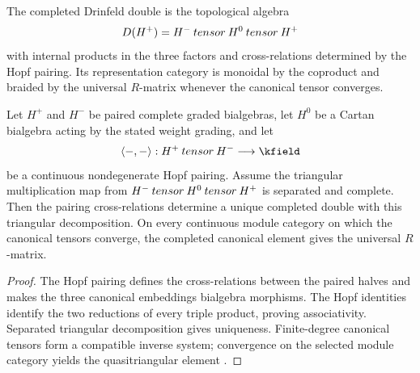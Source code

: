 \begin{definition}
The completed Drinfeld double is the topological algebra
\[
 D(H^+)=H^-\mathbin{tensor} H^0\mathbin{tensor} H^+
\]
with internal products in the three factors and cross-relations determined by the Hopf pairing. Its representation category is monoidal by the coproduct and braided by the universal $R$-matrix whenever the canonical tensor converges.
\end{definition}

\begin{theorem}
Let $H^+$ and $H^-$ be paired complete graded bialgebras, let $H^0$ be a Cartan bialgebra acting by the stated weight grading, and let
\[
 \angles{-,-}:H^+\widehattensor H^-\longrightarrow\kfield
\]
be a continuous nondegenerate Hopf pairing. Assume the triangular multiplication map from $H^-\mathbin{tensor} H^0\mathbin{tensor} H^+$ is separated and complete. Then the pairing cross-relations determine a unique completed double with this triangular decomposition. On every continuous module category on which the canonical tensors converge, the completed canonical element gives the universal $R$-matrix.
\end{theorem}
\begin{proof}
The Hopf pairing defines the cross-relations between the paired halves and makes the three canonical embeddings bialgebra morphisms. The Hopf identities identify the two reductions of every triple product, proving associativity. Separated triangular decomposition gives uniqueness. Finite-degree canonical tensors form a compatible inverse system; convergence on the selected module category yields the quasitriangular element \cite{DrinfeldDouble,EtingofSchiffmann}.
\end{proof}

